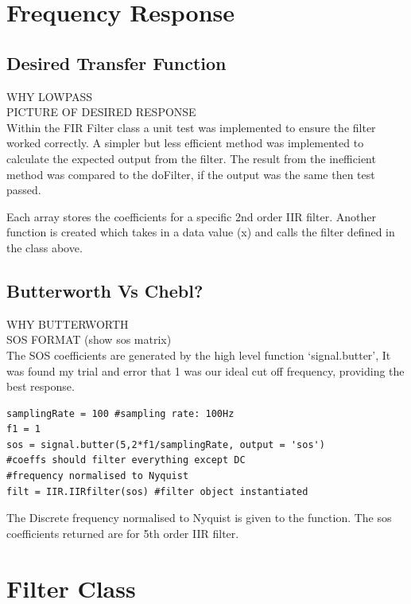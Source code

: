 \documentclass{article}
\begin{document}
\section{Frequency Response}
\subsection{Desired Transfer Function}
WHY LOWPASS\\
PICTURE OF DESIRED RESPONSE\\

Within the FIR Filter class a unit test was implemented to ensure the filter worked correctly. A simpler but less efficient method was implemented to calculate the expected output from the filter. The result from the inefficient method was compared to the doFilter, if the output was the same then test passed.

Each array stores the coefficients for a specific 2nd order IIR filter. Another function is created which takes in a data value (x) and calls the filter defined in the class above.

\subsection{Butterworth Vs Chebl?}
WHY BUTTERWORTH\\
SOS FORMAT (show sos matrix)\\

The SOS coefficients are generated by the high level function `signal.butter', It was found my trial and error that 1 was our ideal cut off frequency, providing the best response.
\lstset{language=Python}
\begin{lstlisting}
samplingRate = 100 #sampling rate: 100Hz
f1 = 1
sos = signal.butter(5,2*f1/samplingRate, output = 'sos')
#coeffs should filter everything except DC
#frequency normalised to Nyquist
filt = IIR.IIRfilter(sos) #filter object instantiated
\end{lstlisting}
The Discrete frequency normalised to Nyquist is given to the function. The sos coefficients returned are for 5th order IIR filter. 

\section{Filter Class}
\end{document}
